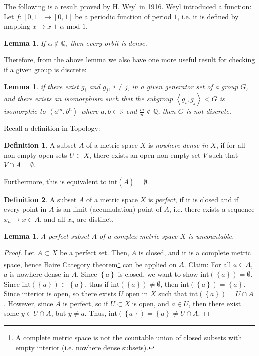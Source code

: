 \documentclass[12pt,oneside]{sfsuthesis}
\theoremstyle{plain} %
\newtheorem{lemma}[theorem]{Lemma}
\theoremstyle{definition}  %
\newtheorem{definition}{Definition}[chapter]
\theoremstyle{remark}  %
\theoremstyle{plain}
\begin{document}
{The following is a result proved by H. Weyl in 1916. Weyl introduced a function: Let $f:[0,1]\longrightarrow [0,1]$ be a periodic function of period $1$, i.e. it is defined by mapping $x\mapsto x+\alpha \text{ mod } 1$,
\begin{lemma}\cite[Proposition 4.12]{series2008hyperbolic}
If $\alpha\notin \mathbb{Q}$, then every orbit is dense.
\end{lemma}

Therefore, from the above lemma we also have one more useful result for checking if a given group is discrete:
\begin{lemma}
if there exist $g_i$ and $g_j$, $i\neq j$, in a given generator set of a group $G$, and there exists an isomorphism such that the subgroup $\left\langle g_i,g_j\right\rangle<G$ is isomorphic to $\left\langle a^m,b^n\right\rangle$ where $a,b\in\mathbb{R}$ and $\frac{m}{n}\notin\mathbb{Q}$, then $G$ is not discrete.
\end{lemma}


Recall a definition in Topology:
\begin{definition}\cite{series2008hyperbolic}
A subset $A$ of a metric space $X$ is \textit{nowhere dense in $X$}, if for all non-empty open sets $U\subset X$, there exists an open non-empty set $V$ such that $V\cap A=\emptyset$. 
\end{definition}
Furthermore, this is equivalent to $\text{int}(\overline{A})=\emptyset$.

\begin{definition}\cite{series2008hyperbolic}
A subset $A$ of a metric space $X$ is \textit{perfect}, if it is closed and if every point in $A$ is an limit (accumulation) point of $A$, i.e. there exists a sequence $x_n\to x\in A$, and all $x_n$ are distinct.
\end{definition}

\begin{lemma}\cite{series2008hyperbolic}\label{Baire}
A perfect subset $A$ of a complex metric space $X$ is uncountable.
\end{lemma}
\begin{proof}
Let $A\subset X$ be a perfect set. Then, $A$ is closed, and it is a complete metric space, hence Baire Category theorem\footnote{A complete metric space is not the countable union of closed subsets with
empty interior (i.e. nowhere dense subsets)\cite[Theorem 6.76]{axler2021measure}.} can be applied on $A$. Claim: For all $a\in A$, $a$ is nowhere dense in $A$. Since $\left\lbrace a\right\rbrace$ is closed, we want to show $\text{int}(\left\lbrace a \right\rbrace)=\emptyset$. Since $\text{int}(\left\lbrace a \right\rbrace)\subset \left\lbrace a\right\rbrace$, thus if $\text{int}(\left\lbrace a \right\rbrace)\neq \emptyset$, then $\text{int}(\left\lbrace a \right\rbrace)=\left\lbrace a \right\rbrace$. Since interior is open, so there exists $U$ open in $X$ such that $\text{int}(\left\lbrace a \right\rbrace)=U \cap A$. However, since $A$ is perfect, so if $U\subset X$ is open, and $a\in U$, then there exist some $y \in U \cap A$, but $y\neq a$. Thus, $\text{int}(\left\lbrace a \right\rbrace)=\left\lbrace a \right\rbrace\neq U \cap A$.
\end{proof}


}
\end{document}
